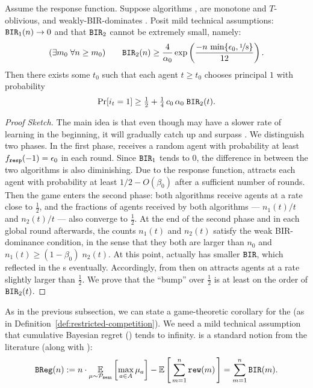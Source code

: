 \begin{theorem}\label{thm:SoftMax-strong}
Assume the \SoftMaxRandom response function. Suppose algorithms \alg[1], \alg[2] are monotone and $T$-oblivious, and \alg[1] weakly-BIR-dominates \alg[2]. Posit mild technical assumptions:
  $\mathtt{BIR}_1(n) \to 0$ and that $\mathtt{BIR}_2$ cannot be extremely small, namely:
\begin{align}\label{eq:SoftMax-assn-strong}
(\exists m_0\; \forall n\geq m_0) \qquad
\mathtt{BIR}_2(n) \geq \frac{4}{\alpha_0}
\exp \left( \frac{-n\,\min\{\epsilon_0, \nicefrac{1}{8}\}}{12}\right).
\end{align}
Then there
  exists some $t_0$ such that each agent $t\geq t_0$ chooses principal
  $1$ with probability
\begin{align}\label{eq:thm:SoftMax-strong}
     \Pr[i_t = 1]\geq \tfrac12 +  \tfrac14 \,c_0\,\alpha_0\; \mathtt{BIR}_2(t).
\end{align}
\end{theorem}

\begin{proof}[Proof Sketch]
The main idea is that even though \alg[1] may have a
slower rate of learning in the beginning, it will gradually catch up
and surpass \alg[2]. We distinguish two phases. In
the first phase, \alg[1] receives a random agent with probability at
least $f_{\mathtt{resp}}(-1) = \epsilon_0$ in each round. Since $\mathtt{BIR}_1$ tends to 0,
the difference in  between the two algorithms is also
diminishing. Due to the \SoftMaxRandom response function, \alg[1]
attracts each agent with probability at least $1/2 - O(\beta_0)$ after
a sufficient number of rounds. Then the game enters the second phase:
both algorithms receive agents at a rate close to $\tfrac12$, and the
fractions of agents received by both algorithms --- $n_1(t)/t$ and
$n_2(t)/t$ --- also converge to $\tfrac12$. At the end of the second
phase and in each global round afterwards, the counts $n_1(t)$ and
$n_2(t)$ satisfy the weak BIR-dominance condition, in the sense that
they both are larger than $n_0$ and $n_1(t)\geq (1-\beta_0)\; n_2(t)$.
At this point, \alg[1] actually has smaller $\mathtt{BIR}$, which reflected in the {\PMR}s eventually. Accordingly, from then on \alg[1]
attracts agents at a rate slightly larger than $\tfrac12$. We prove
that the ``bump'' over $\tfrac12$ is at least on the order of
$\mathtt{BIR}_2(t)$.
\end{proof}

As in the previous subsection, we can state a game-theoretic corollary for the \FiniteGame (as in Definition~\ref{def:restricted-competition}). We need a mild technical assumption that cumulative Bayesian regret (\BReg) tends to infinity. \BReg is a standard notion from the literature (along with \BIR):
\begin{align}\label{eq:SoftMax-BReg}
\BReg(n) := n\cdot \E_{\mu\sim\priorMu}
    \left[ \max_{a\in A} \mu_a\right] -
    \E\sbr{ \sum_{m=1}^n \rew(m)}
    = \sum_{m=1}^n \BIR(m).
\end{align}


